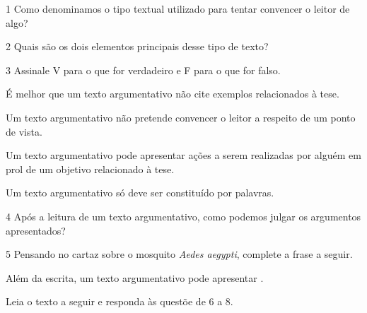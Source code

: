 \pagebreak
{}

\num{1} Como denominamos o tipo textual utilizado para tentar convencer o leitor
de algo?


\num{2} Quais são os dois elementos principais desse tipo de texto?


\num{3} Assinale V para o que for verdadeiro e F para o que for falso.

\begin{boxlist}
 É melhor que um texto argumentativo não cite exemplos relacionados à tese.

 Um texto argumentativo não pretende convencer o leitor a respeito de
um ponto de vista.

 Um texto argumentativo pode apresentar ações a serem realizadas por alguém em prol de um objetivo relacionado à tese.

 Um texto argumentativo só deve ser constituído por palavras.
\end{boxlist}

\num{4} Após a leitura de um texto argumentativo, como podemos julgar os argumentos apresentados?


\num{5} Pensando no cartaz sobre o mosquito \textit{Aedes aegypti}, complete a frase a seguir.

\bigskip
\bigskip
\bigskip

\noindent{}Além da escrita, um texto argumentativo pode apresentar .

\pagebreak

\noindent{}Leia o texto a seguir e responda às questõe de 6 a 8.

